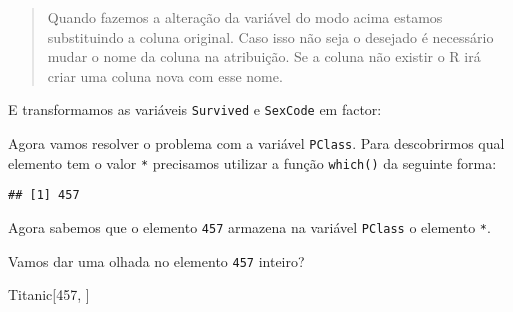 \documentclass[]{book}
\newenvironment{Shaded}{\begin{snugshade}}{\end{snugshade}}
\newcommand{\DecValTok}[1]{\textcolor[rgb]{0.00,0.00,0.81}{#1}}
\newcommand{\KeywordTok}[1]{\textcolor[rgb]{0.13,0.29,0.53}{\textbf{#1}}}
\newcommand{\NormalTok}[1]{#1}
\newcommand{\OperatorTok}[1]{\textcolor[rgb]{0.81,0.36,0.00}{\textbf{#1}}}
\newcommand{\StringTok}[1]{\textcolor[rgb]{0.31,0.60,0.02}{#1}}
\theoremstyle{definition}
\theoremstyle{definition}
\theoremstyle{definition}
\theoremstyle{remark}
\begin{document}
\begin{Shaded}
\end{Shaded}

\begin{quote}
Quando fazemos a alteração da variável do modo acima estamos substituindo a coluna original. Caso isso não seja o desejado é necessário mudar o nome da coluna na atribuição. Se a coluna não existir o R irá criar uma coluna nova com esse nome.
\end{quote}

E transformamos as variáveis \texttt{Survived} e \texttt{SexCode} em factor:

\begin{Shaded}
\end{Shaded}

Agora vamos resolver o problema com a variável \texttt{PClass}. Para descobrirmos qual elemento tem o valor \texttt{*} precisamos utilizar a função \texttt{which()} da seguinte forma:

\begin{Shaded}
\end{Shaded}

\begin{verbatim}
## [1] 457
\end{verbatim}

Agora sabemos que o elemento \texttt{457} armazena na variável \texttt{PClass} o elemento \texttt{*}.

Vamos dar uma olhada no elemento \texttt{457} inteiro?

\begin{Shaded}
\begin{Highlighting}[]
\NormalTok{Titanic[}\DecValTok{457}\NormalTok{, ]}
\end{Highlighting}
\end{Shaded}
\end{document}
